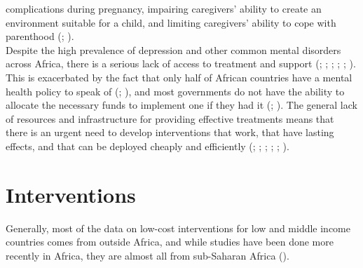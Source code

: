 \documentclass[stu,a4paper,12pt,donotrepeattitle]{apa7}
\begin{document}
complications during pregnancy, impairing caregivers' ability to create an
environment suitable for a child, and limiting caregivers' ability to cope with
parenthood (\cite{fernaetal21}; \cite{nyatetal16}).\\
Despite the high prevalence of depression and other common mental disorders
across Africa, there is a serious lack of access to treatment and support
(\cite{chibandaetal11}; \cite{chibandaetal15}; \cite{chibandaetal16};
\cite{douketal21}; \cite{fernaetal21}; \cite{logetal18}). This is exacerbated
by the fact that only half of African countries have a mental health policy to
speak of (\cite{lunetal14}; \cite{lunderal15}), and most governments do not have
the ability to allocate the necessary funds to implement one if they had it
(\cite{douketal21}; \cite{logetal18}). The general lack of resources and
infrastructure for providing effective treatments means that there is an urgent
need to develop interventions that work, that have lasting effects, and that can
be deployed cheaply and efficiently (\cite{douketal21}; \cite{lunetal14};
\cite{lunderal15}; \cite{Osetal20}; \cite{Osetal20b}; \cite{Oseral21}).
\section{Interventions}
Generally, most of the data on low-cost interventions for low and middle income
countries comes from outside Africa, and while studies have been done more
recently in Africa, they are almost all from sub-Saharan Africa
(\cite{logetal18}).
\newpage
\printbibliography
\end{document}
